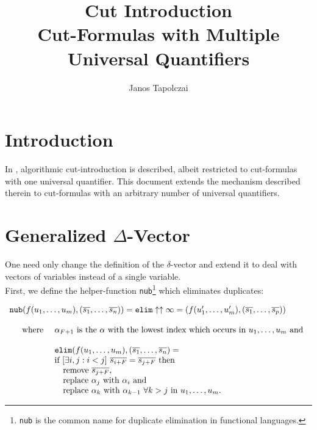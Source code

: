 \documentclass[a4paper, 11pt]{report}
\title{Cut Introduction\\ \vspace{0.5cm} Cut-Formulas with Multiple Universal Quantifiers}
\author{Janos Tapolczai}
\newcommand{\mt}[1]{\textnormal{#1}}
\begin{document}
\maketitle

\section{Introduction}

In \cite[Ch. 5]{cutIntro2013}, algorithmic cut-introduction is described, albeit restricted to cut-formulas with
one universal quantifier. This document extends the mechanism described therein to cut-formulas with an
arbitrary number of universal quantifiers.

\section{Generalized $\Delta$-Vector}

One need only change the definition of the $\delta$-vector and extend it to deal with vectors of variables
instead of a single variable.\\

\noindent
First, we define the helper-function \texttt{nub}\footnote{\texttt{nub} is the common name for duplicate elimination in functional languages.} which eliminates duplicates:

$$
  \begin{array}{l}
    \texttt{nub}(f(u_1,\dots,u_m), (\overline{s_1},\dots,\overline{s_n})) = \texttt{elim} \uparrow \uparrow \infty =
    (f(u_1',\dots,u_m'), (\overline{s_1},\dots,\overline{s_p}))\\

    \\

    \quad 
      \begin{array}{l l}
        \mt{where } &
        \alpha_{F+1} \mt{ is the } \alpha \mt{ with the lowest index which occurs in } u_1,\dots,u_m \mt{ and}\\

        \\

        & \texttt{elim}(f(u_1,\dots,u_m), (\overline{s_1},\dots,\overline{s_n}) =\\
        & \mt{if } [\exists i,j: i < j]\ \overline{s_{i+F}} = \overline{s_{j+F}} \mt { then}\\
        & \quad \mt{remove } \overline{s_{j+F}},\\
        & \quad \mt{replace } \alpha_j \mt { with } \alpha_i \mt{ and }\\
        & \quad \mt{replace } \alpha_k \mt{ with } \alpha_{k-1}\ \forall k > j \mt{ in } u_1,\dots,u_m \mt{.}
        \\
      \end{array}
  \end{array}
$$
\end{document}
